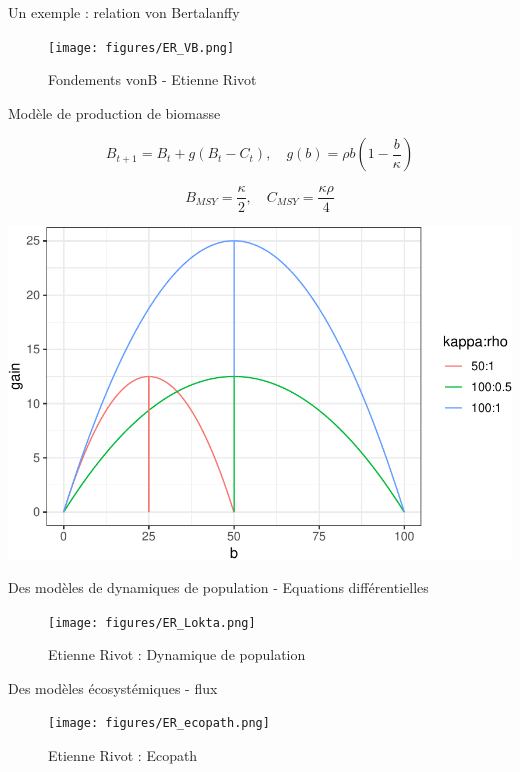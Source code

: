 \documentclass[10pt,ignorenonframetext,]{beamer}
\begin{document}
\begin{frame}{Un exemple : relation von Bertalanffy}

\begin{figure}
\centering
\texttt{[image: figures/ER\_VB.png]}
\caption{Fondements vonB - Etienne Rivot}
\end{figure}

\end{frame}

\begin{frame}{Modèle de production de biomasse}

\[B_{t+1} = B_t + g( B_t - C_t),\quad g(b) = \rho b \left (1 - \frac{b}{\kappa}\right)\]

\[B_{MSY} = \frac{\kappa}{2}, \quad C_{MSY} = \frac{\kappa \rho}{4}\]
\scriptsize

\begin{center}\includegraphics[width=.8\textwidth]{figures/unnamed-chunk-6-1} \end{center}

\normalsize

\end{frame}

\begin{frame}{Des modèles de dynamiques de population - Equations
différentielles}

\begin{figure}
\centering
\texttt{[image: figures/ER\_Lokta.png]}
\caption{Etienne Rivot : Dynamique de population}
\end{figure}

\end{frame}

\begin{frame}{Des modèles écosystémiques - flux}

\begin{figure}
\centering
\texttt{[image: figures/ER\_ecopath.png]}
\caption{Etienne Rivot : Ecopath}
\end{figure}

\end{frame}
\end{document}
